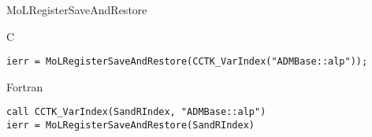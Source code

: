 \begin{FunctionDescription}{MoLRegisterSaveAndRestore}
  \begin{ExampleSection}
    \begin{Example}{C}
\begin{verbatim}
ierr = MoLRegisterSaveAndRestore(CCTK_VarIndex("ADMBase::alp"));
\end{verbatim}
    \end{Example}
    \begin{Example}{Fortran}
\begin{verbatim}
call CCTK_VarIndex(SandRIndex, "ADMBase::alp")
ierr = MoLRegisterSaveAndRestore(SandRIndex)
\end{verbatim}
    \end{Example}
  \end{ExampleSection}

\end{FunctionDescription}



